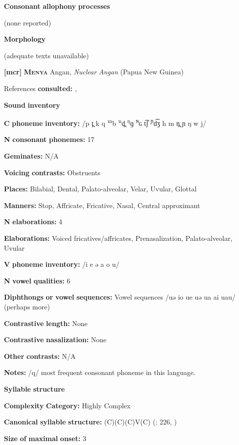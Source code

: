 \textbf{Consonant} \textbf{allophony} \textbf{processes}

(none reported)

\textbf{Morphology}

(adequate texts unavailable)

\textbf{[mcr]}   \textbf{\textsc{Menya}}    Angan, \textit{Nuclear} \textit{Angan} (Papua New Guinea)

References \textbf{consulted:} \citet{Whitehead1992}, \citet{Whitehead2004}

\textbf{Sound} \textbf{inventory}

\textbf{C} \textbf{phoneme} \textbf{inventory:} /p t̪ k q \textsuperscript{m}b \textsuperscript{n}d̪ \textsuperscript{ŋ}ɡ \textsuperscript{ɴ}ɢ t͡ʃ \textsuperscript{ɲ}d͡ʒ h m n̪ ɲ ŋ w j/

\textbf{N} \textbf{consonant} \textbf{phonemes:} 17

\textbf{Geminates:} N/A

\textbf{Voicing} \textbf{contrasts:} Obstruents

\textbf{Places:} Bilabial, Dental, Palato-alveolar, Velar, Uvular, Glottal

\textbf{Manners:} Stop, Affricate, Fricative, Nasal, Central approximant

\textbf{N} \textbf{elaborations:} 4

\textbf{Elaborations:} Voiced fricatives/affricates, Prenasalization, Palato-alveolar, Uvular

\textbf{V} \textbf{phoneme} \textbf{inventory:} /i e ə a o u/

\textbf{N} \textbf{vowel} \textbf{qualities:} 6

\textbf{Diphthongs} \textbf{or} \textbf{vowel} \textbf{sequences:} Vowel sequences /uə io ue uə ua ai uau/ (perhaps more)

\textbf{Contrastive} \textbf{length:} None

\textbf{Contrastive} \textbf{nasalization:} None

\textbf{Other} \textbf{contrasts:} N/A

\textbf{Notes:} /q/ most frequent consonant phoneme in this language.

\textbf{Syllable} \textbf{structure}

\textbf{Complexity} \textbf{Category:} Highly Complex

\textbf{Canonical} \textbf{syllable} \textbf{structure:} (C)(C)(C)V(C) (\citealt{Whitehead2004}: 226, \citealt{Whitehead1992})

\textbf{Size} \textbf{of} \textbf{maximal} \textbf{onset:} 3

